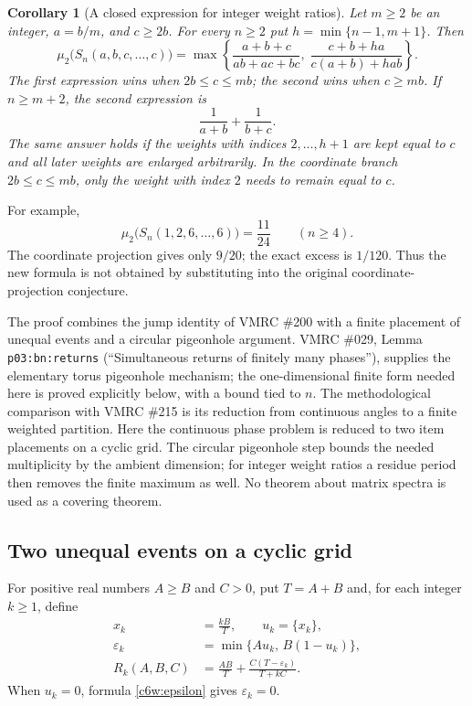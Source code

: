 \documentclass[11pt,a4paper]{article}
\newtheorem{corollary}[theorem]{Corollary}
\theoremstyle{remark}\newtheorem{remark}[theorem]{Remark}
\begin{document}
\begin{corollary}[A closed expression for integer weight ratios]
\label{c6w:ratio}
Let $m\ge2$ be an integer, $a=b/m$, and $c\ge2b$.
For every $n\ge2$ put $h=\min\{n-1,m+1\}$.  Then
\begin{equation}\label{c6w:ratioanswer}
 \boxed{\displaystyle
 \mu_2\bigl(S_n(a,b,c,\ldots,c)\bigr)
 =\max\left\{
 \frac{a+b+c}{ab+ac+bc},\;
 \frac{c+b+ha}{c(a+b)+hab}
 \right\}.}
\end{equation}
The first expression wins when $2b\le c\le mb$; the second
wins when $c\ge mb$.  If $n\ge m+2$, the second expression is
\[
 \frac1{a+b}+\frac1{b+c}.
\]
The same answer holds if the weights with indices
$2,\ldots,h+1$ are kept equal to $c$ and all later weights are
enlarged arbitrarily.  In the coordinate branch $2b\le c\le mb$,
only the weight with index $2$ needs to remain equal to $c$.
\end{corollary}

For example,
\[
 \mu_2\bigl(S_n(1,2,6,\ldots,6)\bigr)=\frac{11}{24}
 \qquad(n\ge4).
\]
The coordinate projection gives only $9/20$; the exact excess is
$1/120$.  Thus the new formula is not obtained by substituting into
the original coordinate-projection conjecture.

The proof combines the jump identity of VMRC \#200 with a finite
placement of unequal events and a circular pigeonhole argument.
VMRC \#029, Lemma \texttt{p03:bn:returns} (``Simultaneous returns
of finitely many phases''), supplies the elementary torus
pigeonhole mechanism; the one-dimensional finite form needed
here is proved explicitly below, with a bound tied to $n$.
The methodological comparison with
VMRC \#215 is its reduction from continuous angles to a finite
weighted partition.  Here the continuous phase problem is reduced
to two item placements on a cyclic grid.  The circular pigeonhole
step bounds the needed multiplicity by the ambient dimension; for
integer weight ratios a residue period then removes the finite
maximum as well.  No theorem
about matrix spectra is used as a covering theorem.

\subsection{Two unequal events on a cyclic grid}

For positive real numbers $A\ge B$ and $C>0$, put $T=A+B$ and,
for each integer $k\ge1$, define
\begin{align}
 x_k&=\frac{kB}{T},\qquad u_k=\{x_k\},\nonumber\\
 \varepsilon_k&=\min\{A u_k,\, B(1-u_k)\},\label{c6w:epsilon}\\
 R_k(A,B,C)&=\frac{AB}{T}
       +\frac{C(T-\varepsilon_k)}{T+kC}.\label{c6w:Rk}
\end{align}
When $u_k=0$, formula \eqref{c6w:epsilon} gives
$\varepsilon_k=0$.
\end{document}
